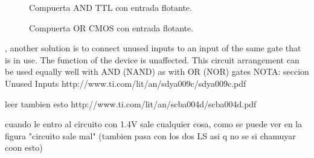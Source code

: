 \begin{figure}[H]
    \begin{minipage}{.49\linewidth}
        \centering
        \caption{Compuerta AND TTL con entrada flotante.}
        \label{fig:ttl-threshold}
    \end{minipage}
    \begin{minipage}{.5\linewidth}
        \centering
        \caption{Compuerta OR CMOS con entrada flotante.}
        \label{fig:cmos-threshold}
    \end{minipage}
\end{figure}


, another solution is to connect unused inputs to an input of the same gate that is in use. The function of the device
is unaffected. This circuit arrangement can be used equally well with AND (NAND) as with OR (NOR) gates 
NOTA: seccion Unused Inputs http://www.ti.com/lit/an/sdya009c/sdya009c.pdf

leer tambien esto http://www.ti.com/lit/an/scba004d/scba004d.pdf

cuando le entro al  circuito con 1.4V sale cualquier cosa, como se puede ver en la figura "circuito sale mal" (tambien pasa con los dos LS asi q no se si chamuyar coon esto)
